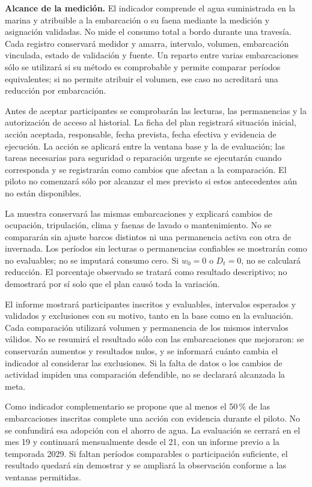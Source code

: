 \textbf{Alcance de la medición.} El indicador comprende el agua suministrada en la marina y atribuible a la embarcación o su faena mediante la medición y asignación validadas. No mide el consumo total a bordo durante una travesía. Cada registro conservará medidor y amarra, intervalo, volumen, embarcación vinculada, estado de validación y fuente. Un reparto entre varias embarcaciones sólo se utilizará si su método es comprobable y permite comparar períodos equivalentes; si no permite atribuir el volumen, ese caso no acreditará una reducción por embarcación.

Antes de aceptar participantes se comprobarán las lecturas, las permanencias y la autorización de acceso al historial. La ficha del plan registrará situación inicial, acción aceptada, responsable, fecha prevista, fecha efectiva y evidencia de ejecución. La acción se aplicará entre la ventana base y la de evaluación; las tareas necesarias para seguridad o reparación urgente se ejecutarán cuando corresponda y se registrarán como cambios que afectan a la comparación. El piloto no comenzará sólo por alcanzar el mes previsto si estos antecedentes aún no están disponibles.

La muestra conservará las mismas embarcaciones y explicará cambios de ocupación, tripulación, clima y faenas de lavado o mantenimiento. No se compararán sin ajuste barcos distintos ni una permanencia activa con otra de invernada. Los períodos sin lecturas o permanencias confiables se mostrarán como no evaluables; no se imputará consumo cero. Si \(w_0=0\) o \(D_t=0\), no se calculará reducción. El porcentaje observado se tratará como resultado descriptivo; no demostrará por sí solo que el plan causó toda la variación.

El informe mostrará participantes inscritos y evaluables, intervalos esperados y validados y exclusiones con su motivo, tanto en la base como en la evaluación. Cada comparación utilizará volumen y permanencia de los mismos intervalos válidos. No se resumirá el resultado sólo con las embarcaciones que mejoraron: se conservarán aumentos y resultados nulos, y se informará cuánto cambia el indicador al considerar las exclusiones. Si la falta de datos o los cambios de actividad impiden una comparación defendible, no se declarará alcanzada la meta.

Como indicador complementario se propone que al menos el 50\,\% de las embarcaciones inscritas complete una acción con evidencia durante el piloto. No se confundirá esa adopción con el ahorro de agua. La evaluación se cerrará en el mes 19 y continuará mensualmente desde el 21, con un informe previo a la temporada 2029. Si faltan períodos comparables o participación suficiente, el resultado quedará sin demostrar y se ampliará la observación conforme a las ventanas permitidas.

